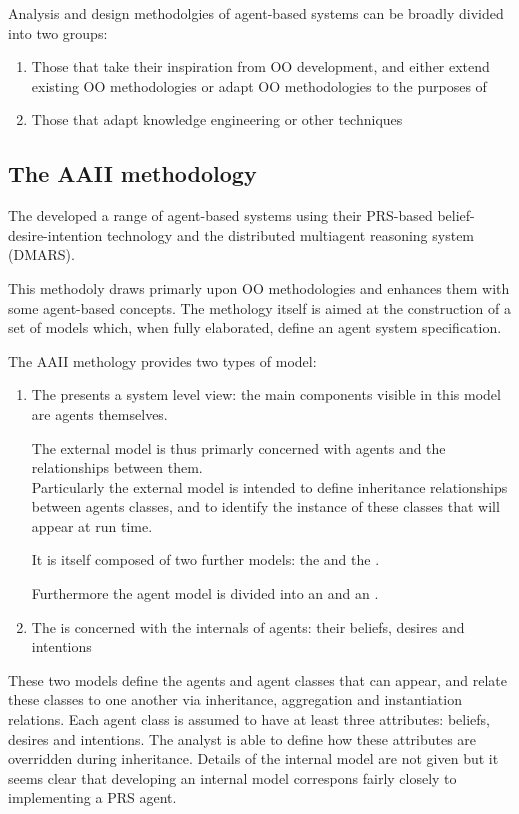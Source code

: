 Analysis and design methodolgies of agent-based systems can be broadly divided into two groups:
\begin{enumerate}
\item Those that take their inspiration from OO development, and either extend existing OO methodologies or adapt OO methodologies to the purposes of 
\item Those that adapt knowledge engineering or other techniques
\end{enumerate}
\subsection{The AAII methodology}
The  developed a range of agent-based systems using their PRS-based belief-desire-intention technology and the distributed  multiagent reasoning system (DMARS).

This methodoly draws primarly upon OO methodologies and enhances them with some agent-based concepts. The methology itself is aimed at the construction of a set of models which, when fully elaborated, define an agent system specification.

The AAII methology provides two types of model:
\begin{enumerate}
\item The  presents a system level view: the main components visible in this model are agents themselves.

The external model is thus primarly concerned with agents and the relationships between them.\\
Particularly the external model is intended to define inheritance relationships between agents classes, and to identify the instance of these classes that will appear at run time.

It is itself composed of two further models: the  and the .

Furthermore the agent model is divided into an  and an . 

\item The  is concerned with the internals of agents: their beliefs, desires and intentions
\end{enumerate}

These two models define the agents and agent classes that can appear, and relate these classes to one another via inheritance, aggregation and instantiation relations.
Each agent class is assumed to have at least three attributes: beliefs, desires and intentions. The analyst is able to define how these attributes are overridden during inheritance.
Details of the internal model are not given but it seems clear that developing an internal model correspons fairly closely to implementing a PRS agent.


